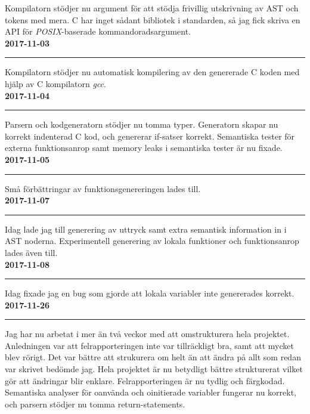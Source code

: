 \documentclass{theme}
\begin{document}
\noindent 
Kompilatorn stödjer nu argument för att stödja frivillig utskrivning av AST och 
tokens med mera. C har inget sådant bibliotek i standarden, så jag fick skriva 
en API för \textit{POSIX}-baserade kommandoradsargument.\\

\noindent\textbf{2017-11-03}\\
\noindent\rule{\textwidth}{1pt}

\noindent 
Kompilatorn stödjer nu automatisk kompilering av den genererade C koden med 
hjälp av C kompilatorn \textit{gcc}. \\

\noindent\textbf{2017-11-04}\\
\noindent\rule{\textwidth}{1pt}

\noindent 
Parsern och kodgeneratorn stödjer nu tomma typer. Generatorn skapar nu korrekt 
indenterad C kod, och genererar if-satser korrekt. Semantiska tester för externa
funktionsanrop samt memory leaks i semantiska tester är nu fixade. \\

\noindent\textbf{2017-11-05}\\
\noindent\rule{\textwidth}{1pt}

\noindent 
Små förbättringar av funktionsgenereringen lades till.\\

\noindent\textbf{2017-11-07}\\
\noindent\rule{\textwidth}{1pt}

\noindent 
Idag lade jag till generering av uttryck samt extra semantisk information in i 
AST noderna. Experimentell generering av lokala funktioner och funktionsanrop 
lades även till. \\

\noindent\textbf{2017-11-08}\\
\noindent\rule{\textwidth}{1pt}

\noindent 
Idag fixade jag en bug som gjorde att lokala variabler inte genererades korrekt.
\\

\noindent\textbf{2017-11-26}\\
\noindent\rule{\textwidth}{1pt}

\noindent 
Jag har nu arbetat i mer än två veckor med att omstrukturera hela 
projektet. Anledningen var att felrapporteringen inte var tillräckligt bra, 
samt att mycket blev rörigt. Det var bättre att strukurera om helt än att ändra 
på allt som redan var skrivet bedömde jag. Hela projektet är nu betydligt bättre
strukturerat vilket gör att ändringar blir enklare. Felrapporteringen är nu 
tydlig och färgkodad. Semantiska analyser för oanvända och oinitierade variabler
fungerar nu korrekt, och parsern stödjer nu tomma return-statements. \\
\end{document}
